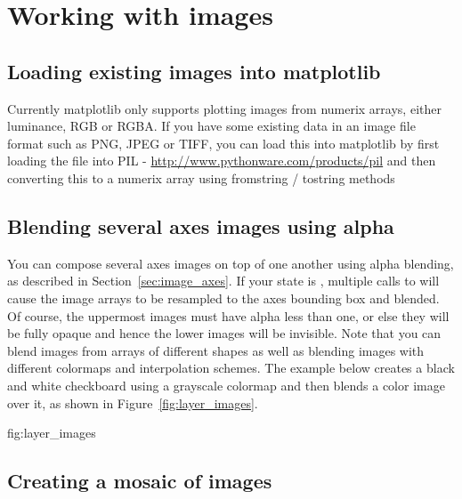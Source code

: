 \documentclass[]{book}
\begin{document}
\section{Working with images}

\subsection{Loading existing images into matplotlib}
\label{cbook:image_files}
Currently matplotlib only supports plotting images from numerix
arrays, either luminance, RGB or RGBA.  If you have some existing data
in an image file format such as PNG, JPEG or TIFF, you can load this
into matplotlib by first loading the file into PIL -
\url{http://www.pythonware.com/products/pil} and then converting this
to a numerix array using fromstring / tostring methods



\subsection{Blending several axes images using alpha}
\label{cbook:layer_images}

You can compose several axes images on top of one another using alpha
blending, as described in Section~\ref{sec:image_axes}.  If your
 state is , multiple calls to
 will cause the image arrays to be resampled to the
axes bounding box and blended.  Of course, the uppermost images must
have alpha less than one, or else they will be fully opaque and hence
the lower images will be invisible.  Note that you can blend images
from arrays of different shapes as well as blending images with
different colormaps and interpolation schemes.  The example below
creates a black and white checkboard using a grayscale colormap and
then blends a color image over it, as shown in
Figure~\ref{fig:layer_images}.

{fig:layer_images}




\subsection{Creating a mosaic of images}
\label{cbook:figure_mosaic}
\end{document}
